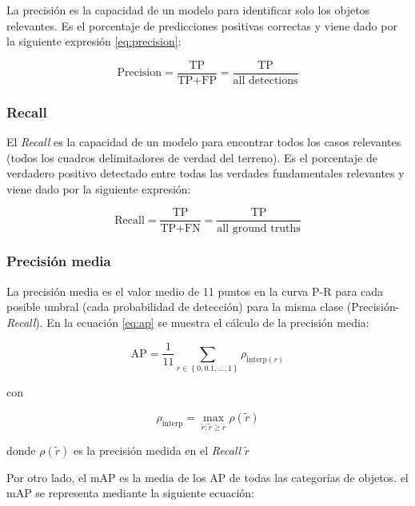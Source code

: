 La precisión es la capacidad de un modelo para identificar solo los objetos relevantes. Es el porcentaje de predicciones positivas correctas y viene dado por la siguiente expresión \ref{eq:precision}:

\begin{equation}
\label{eq:precision}
\text{Precision} = \frac{\text{TP}}{\text{TP}+\text{FP}}=\frac{\text{TP}}{\text{all detections}}
\end{equation}

\subsubsection{Recall}
\label{subsubsec:recall}

El \textit{Recall} es la capacidad de un modelo para encontrar todos los casos relevantes (todos los cuadros delimitadores de verdad del terreno). Es el porcentaje de verdadero positivo detectado entre todas las verdades fundamentales relevantes y viene dado por la siguiente expresión:


\begin{equation}
\label{eq:recall}
\text{Recall} = \frac{\text{TP}}{\text{TP}+\text{FN}}=\frac{\text{TP}}{\text{all ground truths}}
\end{equation}

\subsubsection{Precisión media}
\label{subsubsec:averageprecision}

La precisión media es el valor medio de 11 puntos en la curva P-R para cada posible umbral (cada probabilidad de detección) para la misma clase (Precisión-\textit{Recall}). En la ecuación \ref{eq:ap} se muestra el cálculo de la precisión media:

\begin{equation}
\label{eq:ap}
\text{AP}=\frac{1}{11} \sum_{r\in \left \{ 0, 0.1, ...,1 \right \}}\rho_{\text{interp}\left ( r \right )}
\end{equation}

con

$$\rho_{\text{interp}} = \max_{\tilde{r}:\tilde{r} \geq r} \rho\left ( \tilde{r} \right )$$

donde $\rho\left ( \tilde{r} \right )$ es la precisión medida en el \textit{Recall} $\tilde{r}$

Por otro lado, el mAP es la media de los AP de todas las categorías de objetos. el mAP se representa mediante la siguiente ecuación:

